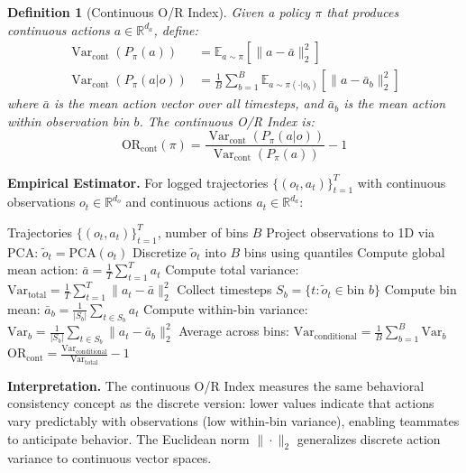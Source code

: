 \documentclass[twoside]{article}
\DeclareMathOperator{\Var}{Var}
\newtheorem{definition}{Definition}
\theoremstyle{remark}
\begin{document}
\begin{definition}[Continuous O/R Index]
Given a policy $\pi$ that produces continuous actions $a \in \mathbb{R}^{d_a}$, define:
\begin{align}
\Var_{\mathrm{cont}}(P_\pi(a)) &= \mathbb{E}_{a \sim \pi}\left[\|a - \bar{a}\|_2^2\right] \label{eq:cont_var_marginal} \\
\Var_{\mathrm{cont}}(P_\pi(a|o)) &= \frac{1}{B} \sum_{b=1}^{B} \mathbb{E}_{a \sim \pi(\cdot|o_b)}\left[\|a - \bar{a}_b\|_2^2\right] \label{eq:cont_var_conditional}
\end{align}
where $\bar{a}$ is the mean action vector over all timesteps, and $\bar{a}_b$ is the mean action within observation bin $b$. The continuous O/R Index is:
\begin{equation}
\mathrm{OR}_{\mathrm{cont}}(\pi) = \frac{\Var_{\mathrm{cont}}(P_\pi(a|o))}{\Var_{\mathrm{cont}}(P_\pi(a))} - 1
\end{equation}
\end{definition}

\textbf{Empirical Estimator.} For logged trajectories $\{(o_t, a_t)\}_{t=1}^{T}$ with continuous observations $o_t \in \mathbb{R}^{d_o}$ and continuous actions $a_t \in \mathbb{R}^{d_a}$:

\begin{algorithm}[H]
\caption{Empirical Continuous-Action O/R Estimator}
\label{alg:cont_or}
\begin{algorithmic}[1]
\Require Trajectories $\{(o_t, a_t)\}_{t=1}^{T}$, number of bins $B$
\State Project observations to 1D via PCA: $\tilde{o}_t = \text{PCA}(o_t)$
\State Discretize $\tilde{o}_t$ into $B$ bins using quantiles
\State Compute global mean action: $\bar{a} = \frac{1}{T} \sum_{t=1}^{T} a_t$
\State Compute total variance: $\text{Var}_{\text{total}} = \frac{1}{T} \sum_{t=1}^{T} \|a_t - \bar{a}\|_2^2$
    \State Collect timesteps $S_b = \{t : \tilde{o}_t \in \text{bin } b\}$
    \State Compute bin mean: $\bar{a}_b = \frac{1}{|S_b|} \sum_{t \in S_b} a_t$
    \State Compute within-bin variance: $\text{Var}_b = \frac{1}{|S_b|} \sum_{t \in S_b} \|a_t - \bar{a}_b\|_2^2$
\EndFor
\State Average across bins: $\text{Var}_{\text{conditional}} = \frac{1}{B} \sum_{b=1}^{B} \text{Var}_b$
\State \Return $\text{OR}_{\text{cont}} = \frac{\text{Var}_{\text{conditional}}}{\text{Var}_{\text{total}}} - 1$
\end{algorithmic}
\end{algorithm}

\textbf{Interpretation.} The continuous O/R Index measures the same behavioral consistency concept as the discrete version: lower values indicate that actions vary predictably with observations (low within-bin variance), enabling teammates to anticipate behavior. The Euclidean norm $\|\cdot\|_2$ generalizes discrete action variance to continuous vector spaces.
\end{document}
